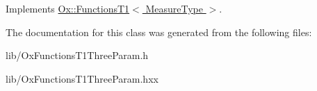 Implements \hyperlink{class_ox_1_1_functions_t1_a2246ea540016c650d5a18100697eacb8}{Ox\-::\-Functions\-T1$<$ Measure\-Type $>$}.



The documentation for this class was generated from the following files\-:\begin{DoxyCompactItemize}
\item 
lib/Ox\-Functions\-T1\-Three\-Param.\-h\item 
lib/Ox\-Functions\-T1\-Three\-Param.\-hxx\end{DoxyCompactItemize}
